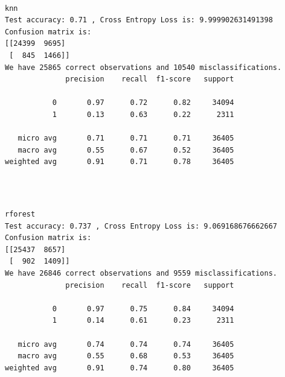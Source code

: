 \documentclass[8pt,onecolumn,aps,pra]{revtex4-1}
\begin{document}
    \begin{center}
    \end{center}
    { \hspace*{\fill} \\}
    
    \begin{Verbatim}[commandchars=\\\{\}]
knn
Test accuracy: 0.71 , Cross Entropy Loss is: 9.999902631491398
Confusion matrix is:
[[24399  9695]
 [  845  1466]]
We have 25865 correct observations and 10540 misclassifications.
              precision    recall  f1-score   support

           0       0.97      0.72      0.82     34094
           1       0.13      0.63      0.22      2311

   micro avg       0.71      0.71      0.71     36405
   macro avg       0.55      0.67      0.52     36405
weighted avg       0.91      0.71      0.78     36405


    \end{Verbatim}

    \begin{center}
    \end{center}
    { \hspace*{\fill} \\}
    
    \begin{Verbatim}[commandchars=\\\{\}]
rforest
Test accuracy: 0.737 , Cross Entropy Loss is: 9.069168676662667
Confusion matrix is:
[[25437  8657]
 [  902  1409]]
We have 26846 correct observations and 9559 misclassifications.
              precision    recall  f1-score   support

           0       0.97      0.75      0.84     34094
           1       0.14      0.61      0.23      2311

   micro avg       0.74      0.74      0.74     36405
   macro avg       0.55      0.68      0.53     36405
weighted avg       0.91      0.74      0.80     36405


    \end{Verbatim}

    \begin{center}
    \end{center}
    { \hspace*{\fill} \\}
    
\end{document}
